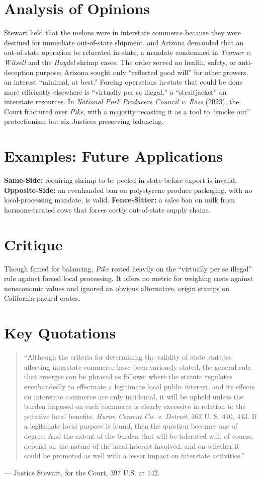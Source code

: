 \documentclass[12pt]{article}
\begin{document}
\section{Analysis of Opinions}
Stewart held that the melons were in interstate commerce because they were destined for immediate out-of-state shipment, and Arizona demanded that an out-of-state operation be relocated in-state, a mandate condemned in \textit{Toomer v. Witsell} and the \textit{Haydel} shrimp cases. The order served no health, safety, or anti-deception purpose; Arizona sought only ``reflected good will'' for other growers, an interest ``minimal, at best.'' Forcing operations in-state that could be done more efficiently elsewhere is ``virtually per se illegal,'' a ``straitjacket'' on interstate resources. In \textit{National Pork Producers Council v. Ross} (2023), the Court fractured over \textit{Pike}, with a majority recasting it as a tool to ``smoke out'' protectionism but six Justices preserving balancing.

\section{Examples: Future Applications}
\textbf{Same-Side:} requiring shrimp to be peeled in-state before export is invalid. \textbf{Opposite-Side:} an evenhanded ban on polystyrene produce packaging, with no local-processing mandate, is valid. \textbf{Fence-Sitter:} a sales ban on milk from hormone-treated cows that forces costly out-of-state supply chains.

\section{Critique}
Though famed for balancing, \textit{Pike} rested heavily on the ``virtually per se illegal'' rule against forced local processing. It offers no metric for weighing costs against noneconomic values and ignored an obvious alternative, origin stamps on California-packed crates.

\section{Key Quotations}
\begin{quote}
``Although the criteria for determining the validity of state statutes affecting interstate commerce have been variously stated, the general rule that emerges can be phrased as follows: where the statute regulates evenhandedly to effectuate a legitimate local public interest, and its effects on interstate commerce are only incidental, it will be upheld unless the burden imposed on such commerce is clearly excessive in relation to the putative local benefits. \textit{Huron Cement Co. v. Detroit}, 362 U. S. 440, 443. If a legitimate local purpose is found, then the question becomes one of degree. And the extent of the burden that will be tolerated will, of course, depend on the nature of the local interest involved, and on whether it could be promoted as well with a lesser impact on interstate activities.''
\end{quote}
\noindent --- Justice Stewart, for the Court, 397 U.S. at 142.
\end{document}
